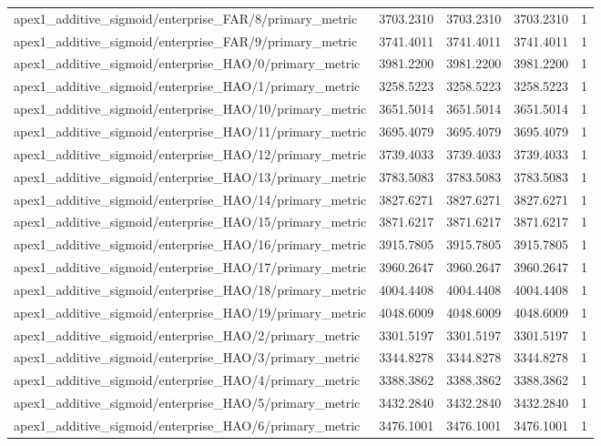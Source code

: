 \begin{table}[h]
\begin{tabular}{lrrrr}
apex1_additive_sigmoid/enterprise_FAR/8/primary_metric & 3703.2310 & 3703.2310 & 3703.2310 & 1 \\
apex1_additive_sigmoid/enterprise_FAR/9/primary_metric & 3741.4011 & 3741.4011 & 3741.4011 & 1 \\
apex1_additive_sigmoid/enterprise_HAO/0/primary_metric & 3981.2200 & 3981.2200 & 3981.2200 & 1 \\
apex1_additive_sigmoid/enterprise_HAO/1/primary_metric & 3258.5223 & 3258.5223 & 3258.5223 & 1 \\
apex1_additive_sigmoid/enterprise_HAO/10/primary_metric & 3651.5014 & 3651.5014 & 3651.5014 & 1 \\
apex1_additive_sigmoid/enterprise_HAO/11/primary_metric & 3695.4079 & 3695.4079 & 3695.4079 & 1 \\
apex1_additive_sigmoid/enterprise_HAO/12/primary_metric & 3739.4033 & 3739.4033 & 3739.4033 & 1 \\
apex1_additive_sigmoid/enterprise_HAO/13/primary_metric & 3783.5083 & 3783.5083 & 3783.5083 & 1 \\
apex1_additive_sigmoid/enterprise_HAO/14/primary_metric & 3827.6271 & 3827.6271 & 3827.6271 & 1 \\
apex1_additive_sigmoid/enterprise_HAO/15/primary_metric & 3871.6217 & 3871.6217 & 3871.6217 & 1 \\
apex1_additive_sigmoid/enterprise_HAO/16/primary_metric & 3915.7805 & 3915.7805 & 3915.7805 & 1 \\
apex1_additive_sigmoid/enterprise_HAO/17/primary_metric & 3960.2647 & 3960.2647 & 3960.2647 & 1 \\
apex1_additive_sigmoid/enterprise_HAO/18/primary_metric & 4004.4408 & 4004.4408 & 4004.4408 & 1 \\
apex1_additive_sigmoid/enterprise_HAO/19/primary_metric & 4048.6009 & 4048.6009 & 4048.6009 & 1 \\
apex1_additive_sigmoid/enterprise_HAO/2/primary_metric & 3301.5197 & 3301.5197 & 3301.5197 & 1 \\
apex1_additive_sigmoid/enterprise_HAO/3/primary_metric & 3344.8278 & 3344.8278 & 3344.8278 & 1 \\
apex1_additive_sigmoid/enterprise_HAO/4/primary_metric & 3388.3862 & 3388.3862 & 3388.3862 & 1 \\
apex1_additive_sigmoid/enterprise_HAO/5/primary_metric & 3432.2840 & 3432.2840 & 3432.2840 & 1 \\
apex1_additive_sigmoid/enterprise_HAO/6/primary_metric & 3476.1001 & 3476.1001 & 3476.1001 & 1 \\

\end{tabular}
\end{table}
